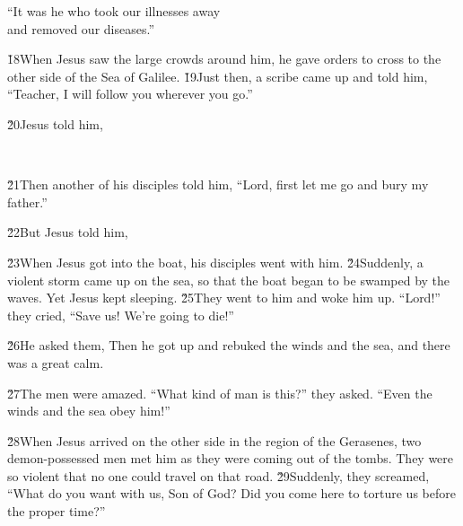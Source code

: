 \begin{poetry}
\poeml ``It was he who took our illnesses away \\
\poemll    and removed our diseases.''
\end{poetry}

\v{18}When Jesus saw the large crowds around him, he gave orders to cross to the other side of the Sea of Galilee. \v{19}Just then, a scribe came up and told him, ``Teacher, I will follow you wherever you go.''

\v{20}Jesus told him,

\begin{poetry}
\poeml {} \\
\poemll    {}
\end{poetry}

\v{21}Then another of his disciples told him, ``Lord, first let me go and bury my father.''

\v{22}But Jesus told him, 

\v{23}When Jesus got into the boat, his disciples went with him. \v{24}Suddenly, a violent storm came up on the sea, so that the boat began to be swamped by the waves. Yet Jesus kept sleeping. \v{25}They went to him and woke him up. ``Lord!'' they cried, ``Save us! We're going to die!''

\v{26}He asked them,  Then he got up and rebuked the winds and the sea, and there was a great calm.

\v{27}The men were amazed. ``What kind of man is this?'' they asked. ``Even the winds and the sea obey him!''

\v{28}When Jesus arrived on the other side in the region of the Gerasenes, two demon-possessed men met him as they were coming out of the tombs. They were so violent that no one could travel on that road. \v{29}Suddenly, they screamed, ``What do you want with us, Son of God? Did you come here to torture us before the proper time?''

